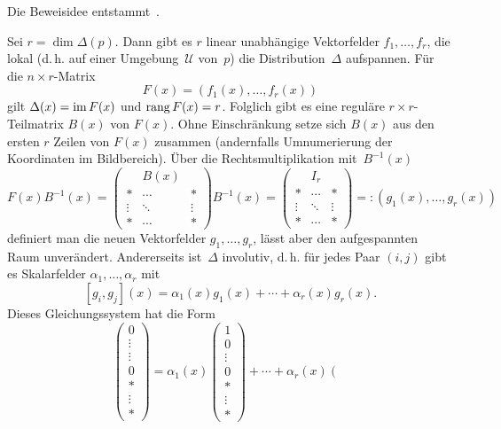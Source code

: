 Die Beweisidee entstammt~\cite[S.~131-132]{jakubczyk2001course}.
\begin{svmultproof2}
Sei $r=\dim\Delta(p)$. Dann gibt es $r$ linear unabhängige Vektorfelder
$f_{1},\ldots,f_{r}$, die lokal (d.\,h. auf einer Umgebung~$\mathcal{U}$
von~$p$) die Distribution~$\Delta$ aufspannen. Für die $n\times r$-Matrix
\[
F(x)=\left(f_{1}(x),\ldots,f_{r}(x)\right)
\]
gilt $\Delta(x)={\operatorname{im}}\,F(x)$ und ${\operatorname{rang}}\,F(x)=r$. Folglich gibt es
eine reguläre $r\times r$-Teilmatrix $B(x)$ von $F(x)$. Ohne Einschränkung
setze sich $B(x)$ aus den ersten $r$ Zeilen von $F(x)$ zusammen
(andernfalls Umnumerierung der Koordinaten im Bildbereich). Über die
Rechtsmultiplikation mit~$B^{-1}(x)$
\[
F(x)B^{-1}(x)=\left(\begin{array}{ccc}
 & B(x)\\
\hline * & \cdots & *\\
\vdots & \ddots & \vdots\\
* & \cdots & *
\end{array}\right)B^{-1}(x)=\left(\begin{array}{ccc}
 & I_{r}\\
\hline * & \cdots & *\\
\vdots & \ddots & \vdots\\
* & \cdots & *
\end{array}\right)=:\left(g_{1}(x),\ldots,g_{r}(x)\right)
\]
definiert man die neuen Vektorfelder $g_{1},\ldots,g_{r}$, lässt
aber den aufgespannten Raum unverändert. Andererseits ist~$\Delta$
involutiv, d.\,h. für jedes Paar $(i,j)$ gibt es Skalarfelder $\alpha_{1},\ldots,\alpha_{r}$
mit 
\[
[g_{i},g_{j}](x)=\alpha_{1}(x)g_{1}(x)+\cdots+\alpha_{r}(x)g_{r}(x).
\]
Dieses Gleichungssystem hat die Form 
\[
\left(\begin{array}{c}
0\\
\vdots\\
\vdots\\
0\\
\hline *\\
\vdots\\
*
\end{array}\right)=\alpha_{1}(x)\left(\begin{array}{c}
1\\
0\\
\vdots\\
0\\
\hline *\\
\vdots\\
*
\end{array}\right)+\cdots+\alpha_{r}(x)\left(\begin{array}{c}

\end{array}\]
\end{svmultproof2}
